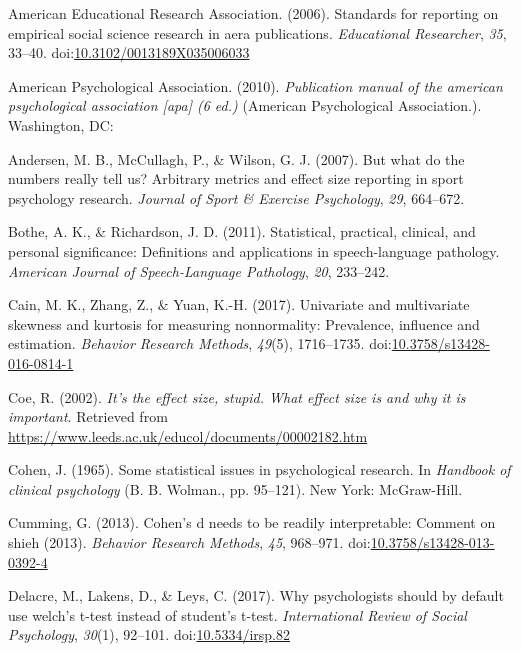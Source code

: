 \documentclass[
  man,floatsintext]{apa6}
\begin{document}
\leavevmode\hypertarget{ref-AERA_2006}{}%
American Educational Research Association. (2006). Standards for reporting on empirical social science research in aera publications. \emph{Educational Researcher}, \emph{35}, 33--40. doi:\href{https://doi.org/10.3102/0013189X035006033}{10.3102/0013189X035006033}

\leavevmode\hypertarget{ref-APA_2010}{}%
American Psychological Association. (2010). \emph{Publication manual of the american psychological association {[}apa{]} (6 ed.)} (American Psychological Association.). Washington, DC:

\leavevmode\hypertarget{ref-Andersen_et_al_2007}{}%
Andersen, M. B., McCullagh, P., \& Wilson, G. J. (2007). But what do the numbers really tell us? Arbitrary metrics and effect size reporting in sport psychology research. \emph{Journal of Sport \& Exercise Psychology}, \emph{29}, 664--672.

\leavevmode\hypertarget{ref-Bothe_Richardson_2011}{}%
Bothe, A. K., \& Richardson, J. D. (2011). Statistical, practical, clinical, and personal significance: Definitions and applications in speech-language pathology. \emph{American Journal of Speech-Language Pathology}, \emph{20}, 233--242.

\leavevmode\hypertarget{ref-Cain_et_al_2017}{}%
Cain, M. K., Zhang, Z., \& Yuan, K.-H. (2017). Univariate and multivariate skewness and kurtosis for measuring nonnormality: Prevalence, influence and estimation. \emph{Behavior Research Methods}, \emph{49}(5), 1716--1735. doi:\href{https://doi.org/10.3758/s13428-016-0814-1}{10.3758/s13428-016-0814-1}

\leavevmode\hypertarget{ref-Coe_2002}{}%
Coe, R. (2002). \emph{It's the effect size, stupid. What effect size is and why it is important}. Retrieved from \url{https://www.leeds.ac.uk/educol/documents/00002182.htm}

\leavevmode\hypertarget{ref-Cohen_1965}{}%
Cohen, J. (1965). Some statistical issues in psychological research. In \emph{Handbook of clinical psychology} (B. B. Wolman., pp. 95--121). New York: McGraw-Hill.

\leavevmode\hypertarget{ref-Cumming_2013}{}%
Cumming, G. (2013). Cohen's d needs to be readily interpretable: Comment on shieh (2013). \emph{Behavior Research Methods}, \emph{45}, 968--971. doi:\href{https://doi.org/10.3758/s13428-013-0392-4}{10.3758/s13428-013-0392-4}

\leavevmode\hypertarget{ref-Delacre_et_al_2017}{}%
Delacre, M., Lakens, D., \& Leys, C. (2017). Why psychologists should by default use welch's t-test instead of student's t-test. \emph{International Review of Social Psychology}, \emph{30}(1), 92--101. doi:\href{https://doi.org/10.5334/irsp.82}{10.5334/irsp.82}
\end{document}
